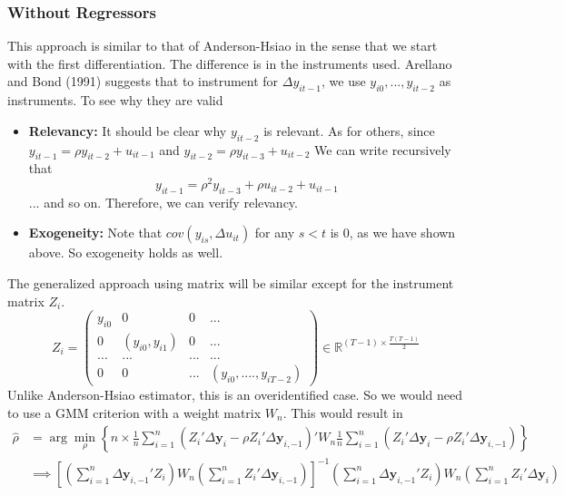 \documentclass[12pt]{article}
\theoremstyle{definition}
\theoremstyle{property}
\theoremstyle{assumption}
\theoremstyle{example}
\theoremstyle{comment}
\begin{document}
\subsubsection{Without Regressors} 
This approach is similar to that of Anderson-Hsiao in the sense that we start with the first differentiation. The difference is in the instruments used. Arellano and Bond (1991) suggests that to instrument for $\Delta y_{it-1}$, we use $y_{i0},...,y_{it-2}$ as instruments. To see why they are valid
\begin{itemize}
\item \textbf{Relevancy:} It should be clear why $y_{it-2}$ is relevant. As for others, since $y_{it-1}=\rho y_{it-2}+u_{it-1}$ and $y_{it-2}=\rho y_{it-3}+u_{it-2}$ We can write recursively that
\[
y_{it-1} = \rho^2 y_{it-3}+\rho u_{it-2} + u_{it-1}
\]
... and so on. Therefore, we can verify relevancy.
\item \textbf{Exogeneity:} Note that $cov(y_{is},\Delta u_{it})$ for any $s<t$ is 0, as we have shown above. So exogeneity holds as well. 
\end{itemize}
The generalized approach using matrix will be similar except for the instrument matrix $Z_i$.
\[
Z_i = \begin{pmatrix}y_{i0}& 0 & 0 & ... \\ 0 & (y_{i0},y_{i1})& 0 & ... \\ ... & ... &...&...\\ 0 & 0 & ... & (y_{i0},....,y_{iT-2}) \end{pmatrix}\in\mathbb{R}^{(T-1)\times \frac{T(T-1)}{2}}
\]
Unlike Anderson-Hsiao estimator, this is an overidentified case. So we would need to use a GMM criterion with a weight matrix $W_n$. This would result in
\begin{align*}
\hat{\rho}&=\arg\min_\rho \left\{n\times \frac{1}{n}\sum_{i=1}^n(Z_i'\Delta \mathbf{y}_i - \rho Z_i'\Delta \mathbf{y}_{i,-1})'W_n  \frac{1}{n}\sum_{i=1}^n(Z_i'\Delta \mathbf{y}_i - \rho Z_i'\Delta \mathbf{y}_{i,-1})\right\}\\
&\implies \left[\left(\sum_{i=1}^n\Delta \mathbf{y}_{i,-1}' Z_i\right)W_n\left(\sum_{i=1}^n Z_i' \Delta \mathbf{y}_{i,-1}\right) \right]^{-1}\left(\sum_{i=1}^n\Delta \mathbf{y}_{i,-1}' Z_i\right)W_n\left(\sum_{i=1}^n Z_i' \Delta \mathbf{y}_i \right)
\end{align*}
\end{document}
